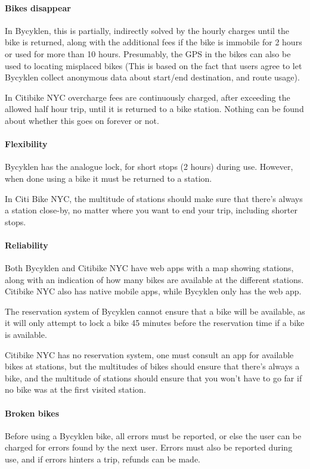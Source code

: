 \paragraph{Bikes disappear}
In Bycyklen, this is partially, indirectly solved by the hourly charges until the bike is returned, along with the additional fees if the bike is immobile for 2 hours or used for more than 10 hours.
Presumably, the GPS in the bikes can also be used to locating misplaced bikes (This is based on the fact that users agree to let Bycyklen collect anonymous data about start/end destination, and route usage).

In Citibike NYC overcharge fees are continuously charged, after exceeding the allowed half hour trip, until it is returned to a bike station.
Nothing can be found about whether this goes on forever or not.

\paragraph{Flexibility}
Bycyklen has the analogue lock, for short stops (2 hours) during use.
However, when done using a bike it must be returned to a station.

In Citi Bike NYC, the multitude of stations should make sure that there's always a station close-by, no matter where you want to end your trip, including shorter stops.

\paragraph{Reliability}
Both Bycyklen and Citibike NYC have web apps with a map showing stations, along with an indication of how many bikes are available at the different stations.
Citibike NYC also has native mobile apps, while Bycyklen only has the web app.

The reservation system of Bycyklen cannot ensure that a bike will be available, as it will only attempt to lock a bike 45 minutes before the reservation time if a bike is available.

Citibike NYC has no reservation system, one must consult an app for available bikes at stations, but the multitudes of bikes should ensure that there's always a bike, and the multitude of stations should ensure that you won't have to go far if no bike was at the first visited station.

\paragraph{Broken bikes}
Before using a Bycyklen bike, all errors must be reported, or else the user can be charged for errors found by the next user.
Errors must also be reported during use, and if errors hinters a trip, refunds can be made.

